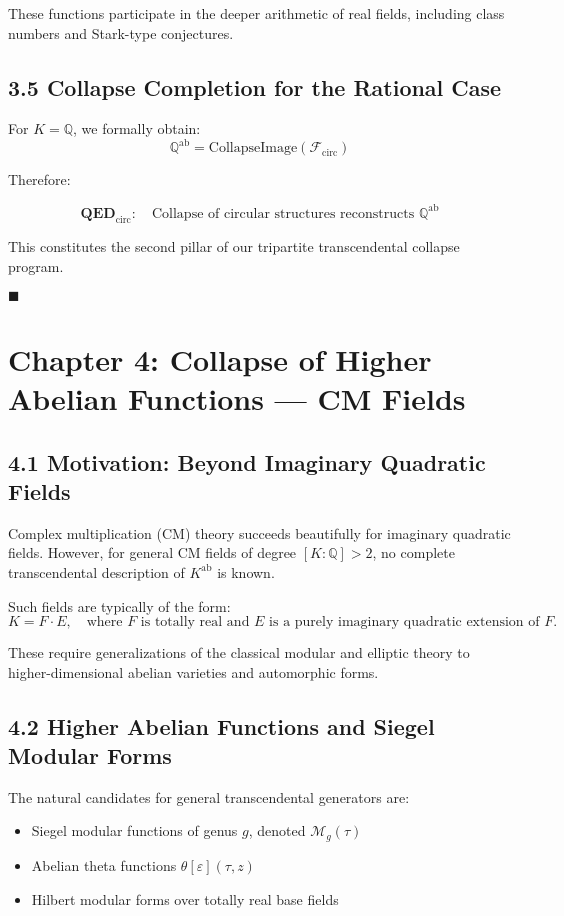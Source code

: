 \documentclass[11pt]{article}
\begin{document}
These functions participate in the deeper arithmetic of real fields, including class numbers and Stark-type conjectures.

\subsection{3.5 Collapse Completion for the Rational Case}

For \( K = \mathbb{Q} \), we formally obtain:
\[
\mathbb{Q}^{\mathrm{ab}} = \text{CollapseImage}(\mathcal{F}_{\mathrm{circ}})
\]

Therefore:

\[
\textbf{QED}_{\mathrm{circ}}: \quad \text{Collapse of circular structures reconstructs } \mathbb{Q}^{\mathrm{ab}}
\]

This constitutes the second pillar of our tripartite transcendental collapse program.

\hfill $\blacksquare$



\section{Chapter 4: Collapse of Higher Abelian Functions — CM Fields}

\subsection{4.1 Motivation: Beyond Imaginary Quadratic Fields}

Complex multiplication (CM) theory succeeds beautifully for imaginary quadratic fields.  
However, for general CM fields of degree \( [K:\mathbb{Q}] > 2 \), no complete transcendental description of \( K^{\mathrm{ab}} \) is known.

Such fields are typically of the form:
\[
K = F \cdot E, \quad \text{where } F \text{ is totally real and } E \text{ is a purely imaginary quadratic extension of } F.
\]

These require generalizations of the classical modular and elliptic theory to higher-dimensional abelian varieties and automorphic forms.

\subsection{4.2 Higher Abelian Functions and Siegel Modular Forms}

The natural candidates for general transcendental generators are:
\begin{itemize}
    \item Siegel modular functions of genus \( g \), denoted \( \mathcal{M}_g(\tau) \)
    \item Abelian theta functions \( \theta[\varepsilon](\tau, z) \)
    \item Hilbert modular forms over totally real base fields
\end{itemize}
\end{document}
